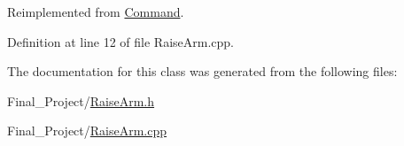 Reimplemented from \hyperlink{classCommand_ae5846b4332a262e055c7a96759fa18f2}{Command}.



Definition at line 12 of file Raise\-Arm.\-cpp.



The documentation for this class was generated from the following files\-:\begin{DoxyCompactItemize}
\item 
Final\-\_\-\-Project/\hyperlink{RaiseArm_8h}{Raise\-Arm.\-h}\item 
Final\-\_\-\-Project/\hyperlink{RaiseArm_8cpp}{Raise\-Arm.\-cpp}\end{DoxyCompactItemize}
